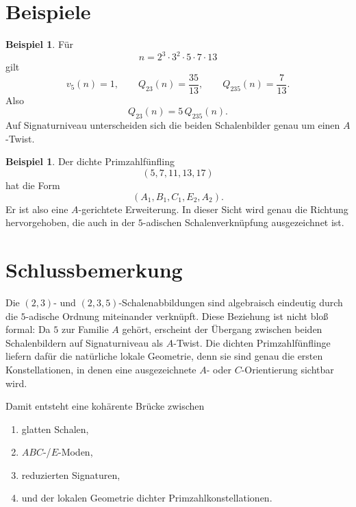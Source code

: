 \documentclass[11pt,a4paper]{article}
\theoremstyle{definition}
\newtheorem{beispiel}[satz]{Beispiel}
\theoremstyle{remark}
\begin{document}
	\section{Beispiele}
	
	\begin{beispiel}
		Für
		\[
		n=2^3\cdot 3^2\cdot 5\cdot 7\cdot 13
		\]
		gilt
		\[
		v_5(n)=1,
		\qquad
		Q_{23}(n)=\frac{35}{13},
		\qquad
		Q_{235}(n)=\frac{7}{13}.
		\]
		Also
		\[
		Q_{23}(n)=5\,Q_{235}(n).
		\]
		Auf Signaturniveau unterscheiden sich die beiden Schalenbilder genau um einen \(A\)-Twist.
	\end{beispiel}
	
	\begin{beispiel}
		Der dichte Primzahlfünfling
		\[
		(5,7,11,13,17)
		\]
		hat die Form
		\[
		(A_1,B_1,C_1,E_2,A_2).
		\]
		Er ist also eine \(A\)-gerichtete Erweiterung. In dieser Sicht wird genau die Richtung
		hervorgehoben, die auch in der \(5\)-adischen Schalenverknüpfung ausgezeichnet ist.
	\end{beispiel}
	
	\section{Schlussbemerkung}
	
	Die \((2,3)\)- und \((2,3,5)\)-Schalenabbildungen sind algebraisch eindeutig durch die
	\(5\)-adische Ordnung miteinander verknüpft. Diese Beziehung ist nicht bloß formal:
	Da \(5\) zur Familie \(A\) gehört, erscheint der Übergang zwischen beiden Schalenbildern auf
	Signaturniveau als \(A\)-Twist. Die dichten Primzahlfünflinge liefern dafür die natürliche lokale
	Geometrie, denn sie sind genau die ersten Konstellationen, in denen eine ausgezeichnete
	\(A\)- oder \(C\)-Orientierung sichtbar wird.
	
	Damit entsteht eine kohärente Brücke zwischen
	\begin{enumerate}[label=\arabic*.]
		\item glatten Schalen,
		\item \(ABC\)-/\(E\)-Moden,
		\item reduzierten Signaturen,
		\item und der lokalen Geometrie dichter Primzahlkonstellationen.
	\end{enumerate}
	
\end{document}
